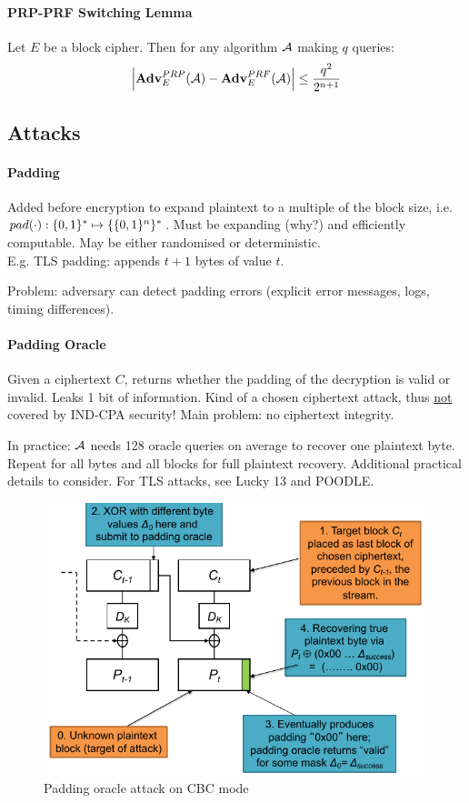 \paragraph{PRP-PRF Switching Lemma}
Let $E$ be a block cipher.
Then for any algorithm $\mathcal{A}$ making $q$ queries:
$$
\Big| \mathbf{Adv}^{PRP}_{E} (\mathcal{A}) - \mathbf{Adv}^{PRF}_{E} (\mathcal{A}) \Big| \leq \frac{q^2}{2^{n+1}}
$$



\subsection{Attacks}

\paragraph{Padding}
Added before encryption to expand plaintext to a multiple of the block size, i.e. \\$pad(\cdot): \lbrace 0, 1 \rbrace^* \mapsto \{ \lbrace 0, 1 \rbrace^n \}^*$.
Must be expanding (why?) and efficiently computable.
May be either randomised or deterministic.
\\
E.g. TLS padding: appends $t+1$ bytes of value $t$.

Problem: adversary can detect padding errors (explicit error messages, logs, timing differences).

\paragraph{Padding Oracle}
Given a ciphertext $C$, returns whether the padding of the decryption is valid or invalid.
Leaks 1 bit of information.
Kind of a chosen ciphertext attack, thus \underline{not} covered by IND-CPA security!
Main problem: no ciphertext integrity.

In practice:
$\mathcal{A}$ needs 128 oracle queries on average to recover one plaintext byte.
Repeat for all bytes and all blocks for full plaintext recovery.
Additional practical details to consider.
For TLS attacks, see Lucky 13 and POODLE.

\begin{figure}[h]
    \centering
	\includegraphics[scale=0.6]{images/cbc-padding-oracle-attack.png}
    \caption{Padding oracle attack on CBC mode}
    \label{fig:cbc-padding-oracle-attack}
\end{figure}

